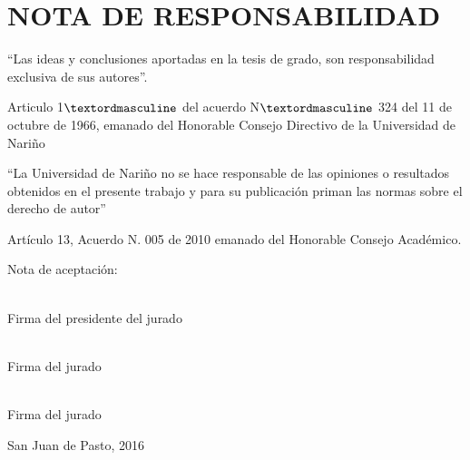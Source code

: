 \chapter*{NOTA DE RESPONSABILIDAD}

``Las ideas y conclusiones aportadas en la tesis de grado, son 
responsabilidad exclusiva de sus autores''.

Articulo 1$\textordmasculine$ del acuerdo N$\textordmasculine$ 324 del 11 de octubre de 1966, 
emanado del 
Honorable Consejo Directivo de la Universidad de Nariño

``La Universidad de Nariño no se hace responsable de las opiniones o resultados obtenidos 
en el presente trabajo y para su publicación priman las normas sobre el derecho de autor''

Artículo 13, Acuerdo N. 005 de 2010 emanado del Honorable Consejo Académico.

\newpage
\vspace*{1 mm}
\begin{flushright}
Nota de aceptación:\linebreak \linebreak \linebreak 

\underline{\hspace{8cm}}\linebreak \linebreak
\underline{\hspace{8cm}}\linebreak \linebreak
\underline{\hspace{8cm}}\linebreak \linebreak
\underline{\hspace{8cm}}

\vspace{1cm}
\underline{\hspace{8cm}}\\
Firma del presidente del jurado \linebreak \linebreak \linebreak \linebreak \linebreak 

\underline{\hspace{8cm}}\\
Firma del jurado \linebreak \linebreak 

\vspace{1cm}
\underline{\hspace{8cm}}\\
Firma del jurado

\end{flushright}


\vspace{1cm}
San Juan de Pasto, 2016 

